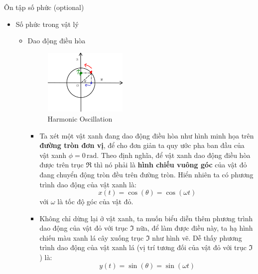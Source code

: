 \documentclass[8pt]{beamer}
\begin{document}
\begin{frame}{Ôn tập số phức (optional)}
	\begin{itemize}
		\item Số phức trong vật lý
			\begin{itemize}
				\item Dao động điều hòa
					\begin{figure}[h]
						\includegraphics[width=0.4\textwidth]{harmonic.png}
						\caption{Harmonic Oscillation}
						\label{fig:re6}
					\end{figure}
	\begin{itemize}
		\item Ta xét một vật xanh đang dao động điều hòa như hình minh họa trên \textbf{đường tròn đơn vị}, để cho đơn giản ta quy ước pha ban đầu của vật xanh $\phi=0 \, \text{rad}$. Theo định nghĩa, để vật xanh dao động điều hòa được trên trục $\Re$ thì nó phải là \textbf{hình chiếu vuông góc} của vật đỏ đang chuyển động tròn đều trên đường tròn. Hiển nhiên ta có phương trình dao động của vật xanh là:
			$$x(t)=\cos(\theta)=\cos(\omega t)$$
với $\omega$ là tốc độ góc của vật đỏ.
\item Không chỉ dừng lại ở vật xanh, ta muốn biểu diễn thêm phương trình dao động của vật đỏ với trục $\Im$ nữa, để làm được điều này, ta hạ hình chiếu màu xanh lá cây xuống trục $\Im$ như hình vẽ. Dễ thấy phương trình dao động của vật xanh lá (vị trí tương đối của vật đỏ với trục $\Im$) là: $$y(t)=\sin{(\theta)}=\sin{(\omega t)}$$
	\end{itemize}
			\end{itemize}
	\end{itemize}
\end{frame}
\end{document}
